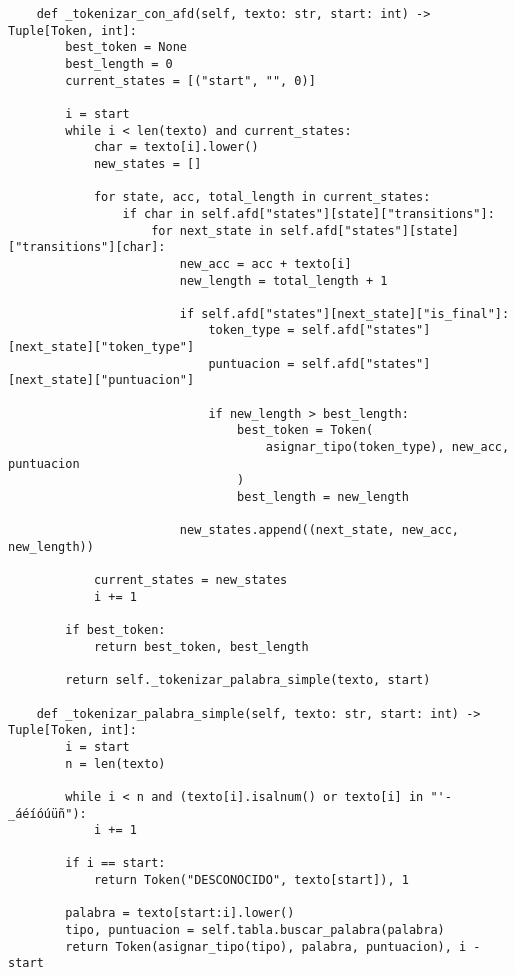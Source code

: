 \begin{lstlisting}
    def _tokenizar_con_afd(self, texto: str, start: int) -> Tuple[Token, int]:
        best_token = None
        best_length = 0
        current_states = [("start", "", 0)]

        i = start
        while i < len(texto) and current_states:
            char = texto[i].lower()
            new_states = []

            for state, acc, total_length in current_states:
                if char in self.afd["states"][state]["transitions"]:
                    for next_state in self.afd["states"][state]["transitions"][char]:
                        new_acc = acc + texto[i]
                        new_length = total_length + 1

                        if self.afd["states"][next_state]["is_final"]:
                            token_type = self.afd["states"][next_state]["token_type"]
                            puntuacion = self.afd["states"][next_state]["puntuacion"]

                            if new_length > best_length:
                                best_token = Token(
                                    asignar_tipo(token_type), new_acc, puntuacion
                                )
                                best_length = new_length

                        new_states.append((next_state, new_acc, new_length))

            current_states = new_states
            i += 1

        if best_token:
            return best_token, best_length

        return self._tokenizar_palabra_simple(texto, start)

    def _tokenizar_palabra_simple(self, texto: str, start: int) -> Tuple[Token, int]:
        i = start
        n = len(texto)

        while i < n and (texto[i].isalnum() or texto[i] in "'-_áéíóúüñ"):
            i += 1

        if i == start:
            return Token("DESCONOCIDO", texto[start]), 1

        palabra = texto[start:i].lower()
        tipo, puntuacion = self.tabla.buscar_palabra(palabra)
        return Token(asignar_tipo(tipo), palabra, puntuacion), i - start
\end{lstlisting}

